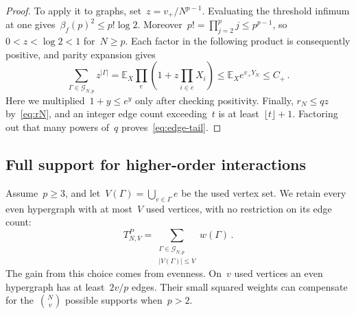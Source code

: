 \documentclass[10pt]{article}
\theoremstyle{plain}
\theoremstyle{definition}
\theoremstyle{remark}
\begin{document}
\begin{proof}
To apply it to graphs, set~$z=v_+/N^{p-1}$. Evaluating the threshold infimum at one gives~$\beta_f(p)^2\le p!\log2$. Moreover~$p!=\prod_{j=2}^pj\le p^{p-1}$, so~$0<z<\log2<1$ for~$N\ge p$. Each factor in the following product is consequently positive, and parity expansion gives
\begin{equation*}
 \sum_{\Gamma\in\mathcal G_{N,p}}z^{|\Gamma|}
 =\mathbb E_X\prod_e\left(1+z\prod_{i\in e}X_i\right)
 \le\mathbb E_Xe^{v_+Y_N}\le C_+\,.
\end{equation*}
Here we multiplied~$1+y\le e^y$ only after checking positivity. Finally, $r_N\le qz$ by~\eqref{eq:rN}, and an integer edge count exceeding~$t$ is at least~$\lfloor t\rfloor+1$. Factoring out that many powers of~$q$ proves~\eqref{eq:edge-tail}.
\end{proof}

\subsection{Full support for higher-order interactions}\label{sec:higher-support}
Assume~$p\ge3$, and let~$V(\Gamma)=\bigcup_{e\in\Gamma}e$ be the used vertex set. We retain every even hypergraph with at most~$V$ used vertices, with no restriction on its edge count:
\begin{equation*}
 T^P_{N,V}=\sum_{\substack{\Gamma\in\mathcal G_{N,p}\\|V(\Gamma)|\le V}}w(\Gamma)\,.
\end{equation*}
The gain from this choice comes from evenness. On~$v$ used vertices an even hypergraph has at least~$2v/p$ edges. Their small squared weights can compensate for the~$\binom Nv$ possible supports when~$p>2$.
\end{document}
